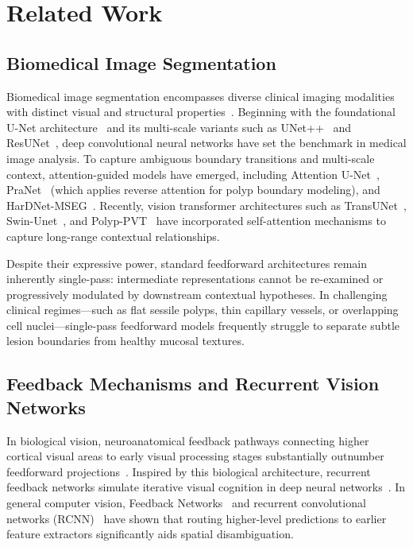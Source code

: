 \section{Related Work}
\label{sec:related}

\subsection{Biomedical Image Segmentation}
Biomedical image segmentation encompasses diverse clinical imaging modalities with distinct visual and structural properties~\cite{litjens2017survey}. Beginning with the foundational U-Net architecture~\cite{ronneberger2015unet} and its multi-scale variants such as UNet++~\cite{zhou2018unetplusplus} and ResUNet~\cite{zhang2018road}, deep convolutional neural networks have set the benchmark in medical image analysis. To capture ambiguous boundary transitions and multi-scale context, attention-guided models have emerged, including Attention U-Net~\cite{oktay2018attention}, PraNet~\cite{fan2020pranet} (which applies reverse attention for polyp boundary modeling), and HarDNet-MSEG~\cite{huang2021hardnet}. Recently, vision transformer architectures such as TransUNet~\cite{chen2021transunet}, Swin-Unet~\cite{cao2022swin}, and Polyp-PVT~\cite{dong2021polyp} have incorporated self-attention mechanisms to capture long-range contextual relationships.

Despite their expressive power, standard feedforward architectures remain inherently single-pass: intermediate representations cannot be re-examined or progressively modulated by downstream contextual hypotheses. In challenging clinical regimes---such as flat sessile polyps, thin capillary vessels, or overlapping cell nuclei---single-pass feedforward models frequently struggle to separate subtle lesion boundaries from healthy mucosal textures.

\subsection{Feedback Mechanisms and Recurrent Vision Networks}
In biological vision, neuroanatomical feedback pathways connecting higher cortical visual areas to early visual processing stages substantially outnumber feedforward projections~\cite{felleman1991distributed, gilbert2013top}. Inspired by this biological architecture, recurrent feedback networks simulate iterative visual cognition in deep neural networks~\cite{liang2015recurrent, zamir2017feedback}. In general computer vision, Feedback Networks~\cite{zamir2017feedback} and recurrent convolutional networks (RCNN)~\cite{pinheiro2014recurrent} have shown that routing higher-level predictions to earlier feature extractors significantly aids spatial disambiguation.

